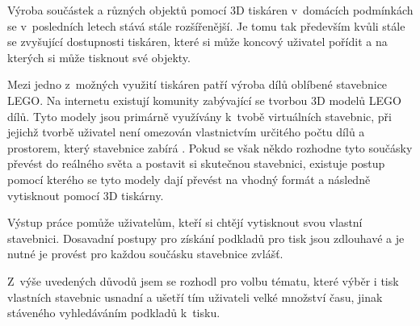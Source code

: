 \label{introduction}
Výroba součástek a různých objektů pomocí 3D tiskáren v~domácích podmínkách se v~posledních letech stává stále rozšířenější. Je tomu tak především kvůli stále se zvyšující dostupnosti tiskáren, které si může koncový uživatel pořídit a na kterých si může tisknout své objekty. 

Mezi jedno z~možných využití tiskáren patří výroba dílů oblíbené stavebnice LEGO. Na internetu existují komunity zabývající se tvorbou 3D modelů LEGO dílů. Tyto modely jsou primárně využívány k~tvobě virtuálních stavebnic, při jejichž tvorbě uživatel není omezován vlastnictvím určitého počtu dílů a prostorem, který stavebnice zabírá \autocite{ldraw:homepage}. Pokud se však někdo rozhodne tyto součásky převést do reálného světa a postavit si skutečnou stavebnici, existuje postup pomocí kterého se tyto modely dají převést na vhodný formát a následně vytisknout pomocí 3D tiskárny.

Výstup práce pomůže uživatelům, kteří si chtějí vytisknout svou vlastní stavebnici. Dosavadní postupy pro získání podkladů pro tisk jsou zdlouhavé a je nutné je provést pro každou součásku stavebnice zvlášť.

Z~výše uvedených důvodů jsem se rozhodl pro volbu tématu, které výběr i tisk vlastních stavebnic usnadní a ušetří tím uživateli velké množství času, jinak stáveného vyhledáváním podkladů k~tisku. 

